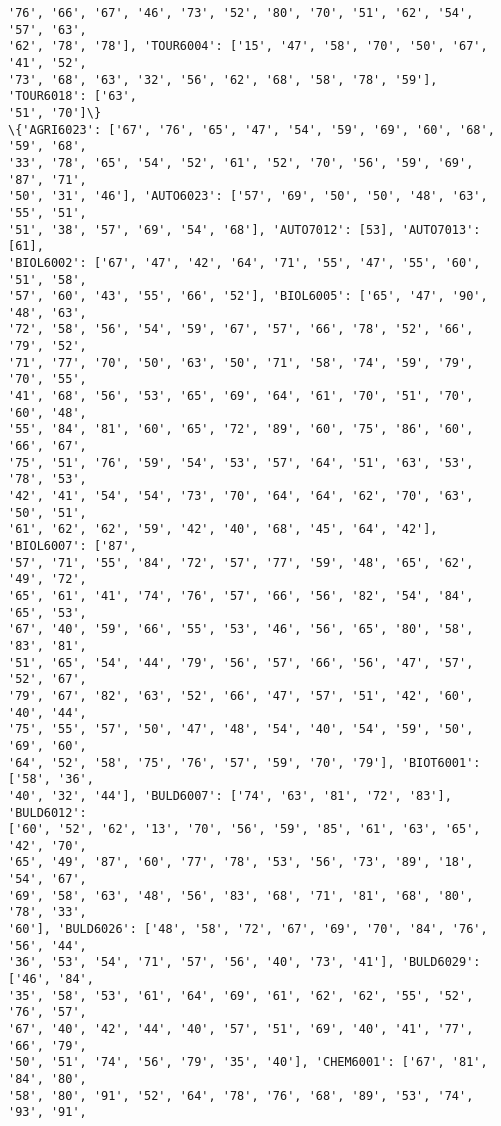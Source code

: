 \documentclass[11pt]{article}
\begin{document}
\begin{Verbatim}[commandchars=\\\{\}]
'76', '66', '67', '46', '73', '52', '80', '70', '51', '62', '54', '57', '63',
'62', '78', '78'], 'TOUR6004': ['15', '47', '58', '70', '50', '67', '41', '52',
'73', '68', '63', '32', '56', '62', '68', '58', '78', '59'], 'TOUR6018': ['63',
'51', '70']\}
\{'AGRI6023': ['67', '76', '65', '47', '54', '59', '69', '60', '68', '59', '68',
'33', '78', '65', '54', '52', '61', '52', '70', '56', '59', '69', '87', '71',
'50', '31', '46'], 'AUTO6023': ['57', '69', '50', '50', '48', '63', '55', '51',
'51', '38', '57', '69', '54', '68'], 'AUTO7012': [53], 'AUTO7013': [61],
'BIOL6002': ['67', '47', '42', '64', '71', '55', '47', '55', '60', '51', '58',
'57', '60', '43', '55', '66', '52'], 'BIOL6005': ['65', '47', '90', '48', '63',
'72', '58', '56', '54', '59', '67', '57', '66', '78', '52', '66', '79', '52',
'71', '77', '70', '50', '63', '50', '71', '58', '74', '59', '79', '70', '55',
'41', '68', '56', '53', '65', '69', '64', '61', '70', '51', '70', '60', '48',
'55', '84', '81', '60', '65', '72', '89', '60', '75', '86', '60', '66', '67',
'75', '51', '76', '59', '54', '53', '57', '64', '51', '63', '53', '78', '53',
'42', '41', '54', '54', '73', '70', '64', '64', '62', '70', '63', '50', '51',
'61', '62', '62', '59', '42', '40', '68', '45', '64', '42'], 'BIOL6007': ['87',
'57', '71', '55', '84', '72', '57', '77', '59', '48', '65', '62', '49', '72',
'65', '61', '41', '74', '76', '57', '66', '56', '82', '54', '84', '65', '53',
'67', '40', '59', '66', '55', '53', '46', '56', '65', '80', '58', '83', '81',
'51', '65', '54', '44', '79', '56', '57', '66', '56', '47', '57', '52', '67',
'79', '67', '82', '63', '52', '66', '47', '57', '51', '42', '60', '40', '44',
'75', '55', '57', '50', '47', '48', '54', '40', '54', '59', '50', '69', '60',
'64', '52', '58', '75', '76', '57', '59', '70', '79'], 'BIOT6001': ['58', '36',
'40', '32', '44'], 'BULD6007': ['74', '63', '81', '72', '83'], 'BULD6012':
['60', '52', '62', '13', '70', '56', '59', '85', '61', '63', '65', '42', '70',
'65', '49', '87', '60', '77', '78', '53', '56', '73', '89', '18', '54', '67',
'69', '58', '63', '48', '56', '83', '68', '71', '81', '68', '80', '78', '33',
'60'], 'BULD6026': ['48', '58', '72', '67', '69', '70', '84', '76', '56', '44',
'36', '53', '54', '71', '57', '56', '40', '73', '41'], 'BULD6029': ['46', '84',
'35', '58', '53', '61', '64', '69', '61', '62', '62', '55', '52', '76', '57',
'67', '40', '42', '44', '40', '57', '51', '69', '40', '41', '77', '66', '79',
'50', '51', '74', '56', '79', '35', '40'], 'CHEM6001': ['67', '81', '84', '80',
'58', '80', '91', '52', '64', '78', '76', '68', '89', '53', '74', '93', '91',

\end{Verbatim}
\end{document}
